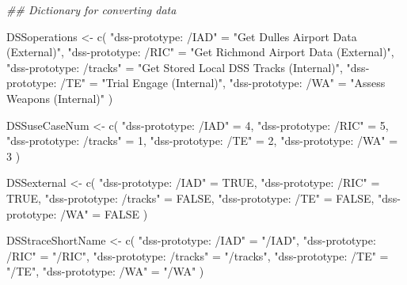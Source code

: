 \documentclass[
  letterpaper,
  DIV=11,
  numbers=noendperiod]{scrartcl}
\newenvironment{Shaded}{\begin{snugshade}}{\end{snugshade}}
\newcommand{\ConstantTok}[1]{\textcolor[rgb]{0.56,0.35,0.01}{#1}}
\newcommand{\DecValTok}[1]{\textcolor[rgb]{0.68,0.00,0.00}{#1}}
\newcommand{\DocumentationTok}[1]{\textcolor[rgb]{0.37,0.37,0.37}{\textit{#1}}}
\newcommand{\FunctionTok}[1]{\textcolor[rgb]{0.28,0.35,0.67}{#1}}
\newcommand{\NormalTok}[1]{\textcolor[rgb]{0.00,0.23,0.31}{#1}}
\newcommand{\OtherTok}[1]{\textcolor[rgb]{0.00,0.23,0.31}{#1}}
\newcommand{\StringTok}[1]{\textcolor[rgb]{0.13,0.47,0.30}{#1}}
\begin{document}
\begin{Shaded}
\begin{Highlighting}[]
\DocumentationTok{\#\# Dictionary for converting data}

\NormalTok{DSSoperations }\OtherTok{\textless{}{-}} \FunctionTok{c}\NormalTok{(}
    \StringTok{"dss{-}prototype: /IAD"} \OtherTok{=} \StringTok{"Get Dulles Airport Data (External)"}\NormalTok{,}
    \StringTok{"dss{-}prototype: /RIC"} \OtherTok{=} \StringTok{"Get Richmond Airport Data (External)"}\NormalTok{,}
    \StringTok{"dss{-}prototype: /tracks"} \OtherTok{=} \StringTok{"Get Stored Local DSS Tracks (Internal)"}\NormalTok{,}
    \StringTok{"dss{-}prototype: /TE"} \OtherTok{=} \StringTok{"Trial Engage (Internal)"}\NormalTok{,}
    \StringTok{"dss{-}prototype: /WA"} \OtherTok{=} \StringTok{"Assess Weapons (Internal)"}
\NormalTok{)}

\NormalTok{DSSuseCaseNum }\OtherTok{\textless{}{-}} \FunctionTok{c}\NormalTok{(}
    \StringTok{"dss{-}prototype: /IAD"} \OtherTok{=} \DecValTok{4}\NormalTok{,}
    \StringTok{"dss{-}prototype: /RIC"} \OtherTok{=} \DecValTok{5}\NormalTok{,}
    \StringTok{"dss{-}prototype: /tracks"} \OtherTok{=} \DecValTok{1}\NormalTok{,}
    \StringTok{"dss{-}prototype: /TE"} \OtherTok{=} \DecValTok{2}\NormalTok{,}
    \StringTok{"dss{-}prototype: /WA"} \OtherTok{=} \DecValTok{3}
\NormalTok{)}

\NormalTok{DSSexternal }\OtherTok{\textless{}{-}} \FunctionTok{c}\NormalTok{(}
    \StringTok{"dss{-}prototype: /IAD"} \OtherTok{=} \ConstantTok{TRUE}\NormalTok{,}
    \StringTok{"dss{-}prototype: /RIC"} \OtherTok{=} \ConstantTok{TRUE}\NormalTok{,}
    \StringTok{"dss{-}prototype: /tracks"} \OtherTok{=} \ConstantTok{FALSE}\NormalTok{,}
    \StringTok{"dss{-}prototype: /TE"} \OtherTok{=} \ConstantTok{FALSE}\NormalTok{,}
    \StringTok{"dss{-}prototype: /WA"} \OtherTok{=} \ConstantTok{FALSE}
\NormalTok{)}

\NormalTok{DSStraceShortName }\OtherTok{\textless{}{-}} \FunctionTok{c}\NormalTok{(}
    \StringTok{"dss{-}prototype: /IAD"} \OtherTok{=} \StringTok{"/IAD"}\NormalTok{,}
    \StringTok{"dss{-}prototype: /RIC"} \OtherTok{=} \StringTok{"/RIC"}\NormalTok{,}
    \StringTok{"dss{-}prototype: /tracks"} \OtherTok{=} \StringTok{"/tracks"}\NormalTok{,}
    \StringTok{"dss{-}prototype: /TE"} \OtherTok{=} \StringTok{"/TE"}\NormalTok{,}
    \StringTok{"dss{-}prototype: /WA"} \OtherTok{=} \StringTok{"/WA"}
\NormalTok{)}
\end{Highlighting}
\end{Shaded}
\end{document}
